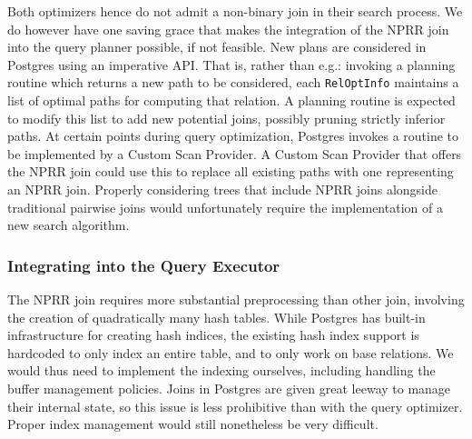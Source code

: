 Both optimizers hence do not admit a non-binary join in their search process. We do however have one saving grace that makes the integration of the NPRR
join into the query planner possible, if not feasible. New plans are considered in Postgres using an imperative API. That is,
rather than e.g.: invoking a planning routine which returns a new path
to be considered, each {\tt RelOptInfo} maintains a list of optimal paths
for computing that relation. A planning routine is expected to modify
this list to add new potential joins, possibly pruning strictly
inferior paths. At certain points during query optimization, Postgres
invokes a routine to be implemented by a Custom
Scan Provider. A Custom Scan Provider that offers the NPRR join could
use this to replace all existing paths with one representing an NPRR
join. Properly considering trees that include NPRR joins alongside
traditional pairwise joins would unfortunately require the
implementation of a new search algorithm.

\subsubsection{Integrating into the Query Executor}

The NPRR join requires more substantial preprocessing than other join,
involving the creation of quadratically many hash tables. While Postgres has built-in infrastructure for creating hash indices,
the existing hash index support is hardcoded to only index an entire
table, and to only work on base relations. We would thus need to
implement the indexing ourselves, including handling the buffer
management policies. Joins in Postgres are given great leeway to manage their internal
state, so this issue is less prohibitive than with the query
optimizer. Proper index management would still nonetheless be very difficult.